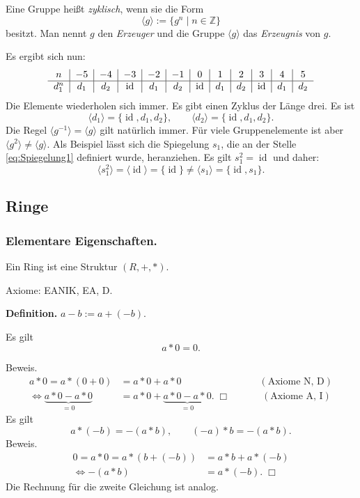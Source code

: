 \documentclass[a4paper,11pt,fleqn,twoside]{scrartcl}
\numberwithin{equation}{section}
\newcommand{\Z}{\mathbb Z}
\newcommand{\id}{\operatorname{id}}
\newcommand{\strong}[1]{{\sf\bfseries #1}}
\newenvironment{Definition}{\par\noindent\strong{Definition.}}{\par}
\begin{document}
\begin{Definition}
Eine Gruppe heißt \emph{zyklisch}, wenn sie die Form
\begin{equation}
\langle g\rangle := \{g^n\mid n\in\Z\}
\end{equation}
besitzt. Man nennt $g$ den \emph{Erzeuger}
und die Gruppe $\langle g\rangle$ das \emph{Erzeugnis} von $g$.
\end{Definition}
Es ergibt sich nun:
\begin{equation}
\begin{tabular}{c|c|c|c|c|c|c|c|c|c|c|c}
$n$ & $-5$ & $-4$ & $-3$ & $-2$ & $-1$
& $0$ & $1$ & $2$ & $3$ & $4$ & $5$\\
\hline
$d_1^n$ & $d_1$ & $d_2$ & $\id$ & $d_1$ & $d_2$
& $\id$ & $d_1$ & $d_2$ & $\id$ & $d_1$ & $d_2$
\end{tabular}
\end{equation}
Die Elemente wiederholen sich immer. Es gibt einen Zyklus
der Länge drei. Es ist
\begin{equation}
\langle d_1\rangle = \{\id,d_1,d_2\},\qquad\langle d_2\rangle = \{\id,d_1,d_2\}.
\end{equation}
Die Regel $\langle g^{-1}\rangle = \langle g\rangle$ gilt natürlich
immer. Für viele Gruppenelemente ist aber
$\langle g^2\rangle\ne \langle g\rangle$. Als Beispiel lässt sich die
Spiegelung $s_1$, die an der Stelle \eqref{eq:Spiegelung1} definiert
wurde, heranziehen. Es gilt $s_1^2=\id$ und daher:
\begin{equation}
\langle s_1^2\rangle = \langle\id\rangle
= \{\id\} \ne \langle s_1\rangle = \{\id,s_1\}.
\end{equation}
\subsection{Ringe}
\subsubsection{Elementare Eigenschaften.}
Ein Ring ist eine Struktur $(R,+,*)$.

Axiome: EANIK, EA, D.

\strong{Definition.} $a-b:=a+(-b)$.

Es gilt
\begin{equation}
a*0=0.
\end{equation}

Beweis.
\begin{align}
a*0 = a*(0+0) &= a*0+a*0\qquad\qquad\qquad\qquad (\text{Axiome N, D})\\
\iff \underbrace{a*0-a*0}_{=0} &= a*0+\underbrace{a*0-a*0}_{=0}.\;\Box
\qquad\quad\; (\text{Axiome A, I})
\end{align}
Es gilt
\begin{equation}\label{eq:minus-minus-plus}
a*(-b) = -(a*b),\qquad (-a)*b = -(a*b).
\end{equation}
Beweis.
\begin{align}
0 = a*0 = a*(b+(-b)) &= a*b+a*(-b)\\
\iff  -(a*b) &= a*(-b).\;\Box
\end{align}
Die Rechnung für die zweite Gleichung ist analog.
\end{document}
